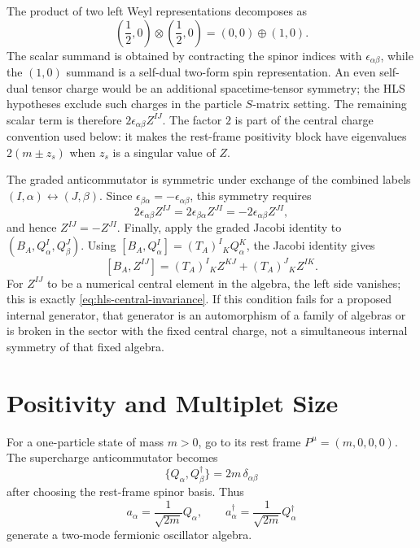The product of two left Weyl representations decomposes as
\[
  \left(\frac12,0\right)\otimes
  \left(\frac12,0\right)
  =
  (0,0)\oplus (1,0).
\]
The scalar summand is obtained by contracting the spinor indices with
\(\epsilon_{\alpha\beta}\), while the \((1,0)\) summand is a self-dual
two-form spin representation.  An even self-dual tensor charge would be an
additional spacetime-tensor symmetry; the HLS hypotheses exclude such charges
in the particle \(S\)-matrix setting.  The remaining scalar term is therefore
\(2\epsilon_{\alpha\beta}Z^{IJ}\).  The factor \(2\) is part of the central
charge convention used below: it makes the rest-frame positivity block have
eigenvalues \(2(m\pm z_s)\) when \(z_s\) is a singular value of \(Z\).

The graded anticommutator is symmetric under exchange of the combined labels
\((I,\alpha)\leftrightarrow(J,\beta)\).  Since
\(\epsilon_{\beta\alpha}=-\epsilon_{\alpha\beta}\), this symmetry requires
\[
  2\epsilon_{\alpha\beta}Z^{IJ}
  =
  2\epsilon_{\beta\alpha}Z^{JI}
  =
  -2\epsilon_{\alpha\beta}Z^{JI},
\]
and hence \(Z^{IJ}=-Z^{JI}\).  Finally, apply the graded Jacobi identity to
\((B_A,Q^I_\alpha,Q^J_\beta)\).  Using
\([B_A,Q^I_\alpha]=(T_A)^I{}_KQ^K_\alpha\), the Jacobi identity gives
\[
  [B_A,Z^{IJ}]
  =
  (T_A)^I{}_K Z^{KJ}+(T_A)^J{}_K Z^{IK}.
\]
For \(Z^{IJ}\) to be a numerical central element in the algebra, the left
side vanishes; this is exactly \eqref{eq:hls-central-invariance}.  If this
condition fails for a proposed internal generator, that generator is an
automorphism of a family of algebras or is broken in the sector with the fixed
central charge, not a simultaneous internal symmetry of that fixed algebra.

\section{Positivity and Multiplet Size}

For a one-particle state of mass \(m>0\), go to its rest frame
\(P^\mu=(m,0,0,0)\).  The supercharge anticommutator becomes
\[
  \{Q_\alpha,Q_\beta^\dagger\}=2m\,\delta_{\alpha\beta}
\]
after choosing the rest-frame spinor basis.  Thus
\[
  a_\alpha=\frac{1}{\sqrt{2m}}Q_\alpha,\qquad
  a_\alpha^\dagger=\frac{1}{\sqrt{2m}}Q_\alpha^\dagger
\]
generate a two-mode fermionic oscillator algebra.

